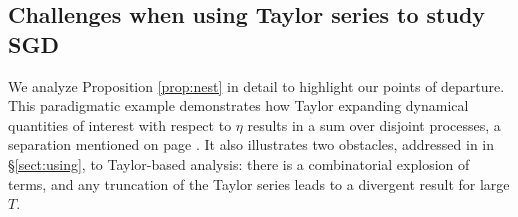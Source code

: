 \documentclass[anon,12pt]{colt2021} %
\begin{document}
        \subsection{Challenges when using Taylor series to study SGD}\label{sect:exegesis}
            We analyze Proposition \ref{prop:nest} in detail to highlight our
            points of departure.  This paradigmatic example demonstrates how
            Taylor expanding dynamical quantities of interest with respect to
            $\eta$ results in a sum over disjoint processes, a separation
            mentioned on page \pageref{sect:intro}.  It also illustrates two
            obstacles, addressed in in \S\ref{sect:using}, to Taylor-based
            analysis: there is a combinatorial explosion of terms, and any
            truncation of the Taylor series leads to a divergent result for
            large $T$.   
\end{document}
